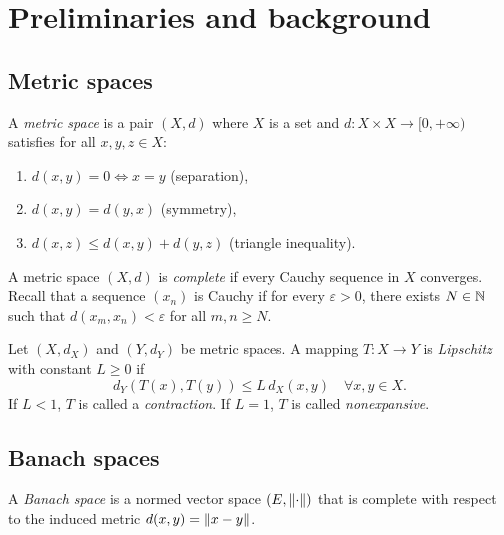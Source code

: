 \section{Preliminaries and background}

\subsection{Metric spaces}

\begin{definition}
A \emph{metric space} is a pair $(X, d)$ where $X$ is a set and
$d : X \times X \to [0, +\infty)$ satisfies for all $x, y, z \in X$:
\begin{enumerate}
    \item $d(x, y) = 0 \Leftrightarrow x = y$ \quad (separation),
    \item $d(x, y) = d(y, x)$ \quad (symmetry),
    \item $d(x, z) \leq d(x, y) + d(y, z)$ \quad (triangle inequality).
\end{enumerate}
\end{definition}

\begin{definition}[Completeness]
A metric space $(X, d)$ is \emph{complete} if every Cauchy sequence in $X$
converges. Recall that a sequence $(x_n)$ is Cauchy if for every
$\varepsilon > 0$, there exists $N \in \mathbb{N}$ such that $d(x_m, x_n) < \varepsilon$
for all $m, n \geq N$.
\end{definition}

\begin{definition}
Let $(X, d_X)$ and $(Y, d_Y)$ be metric spaces. A mapping $T : X \to Y$ is
\emph{Lipschitz} with constant $L \geq 0$ if
\[
    d_Y(T(x), T(y)) \leq L \, d_X(x, y) \quad \forall x, y \in X.
\]
If $L < 1$, $T$ is called a \emph{contraction}. If $L = 1$, $T$ is called
\emph{nonexpansive}.
\end{definition}

\subsection{Banach spaces}

\begin{definition}
A \emph{Banach space} is a normed vector space $(E, \left\| \cdot \right\|)$ that is
complete with respect to the induced metric $d(x,y) = \left\| x - y \right\|$.
\end{definition}

